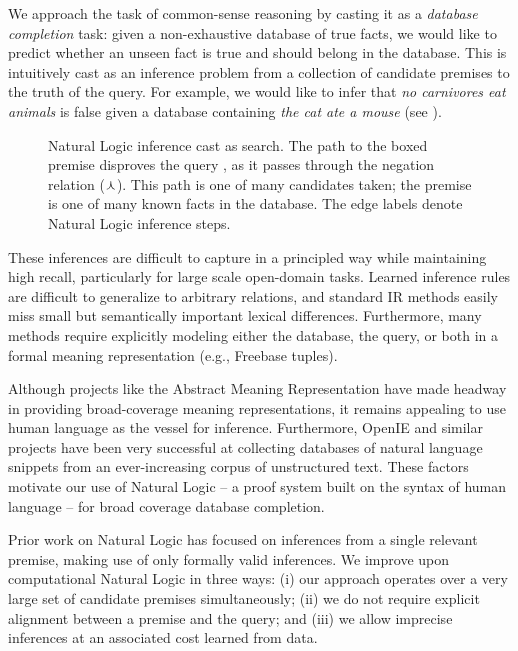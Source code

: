 We approach the task of common-sense reasoning by casting it
  as a \textit{database completion} task: given a non-exhaustive
  database of true facts, we would like to predict whether an unseen fact
  is true and should belong in the database.
This is intuitively cast as an inference problem from 
  a collection of candidate premises to the truth of the query.
For example, we would like to infer 
  that \textit{no carnivores eat animals}
  is false given a database containing \textit{the cat ate a mouse}
  (see ).

\begin{figure}[th]
\begin{center}
  \teaserSearch
\end{center}
{
  Natural Logic inference cast as search. The path to
    the boxed premise  disproves the
    query , as it passes through
    the negation relation ($\curlywedge$).
  This path is one of many candidates taken; the premise
    is one of many known facts in the database.
  The edge labels denote Natural Logic inference steps.
  \label{fig:teaser}
}
\end{figure}

These inferences are difficult to capture in a principled way
  while maintaining high recall, particularly for 
  large scale open-domain tasks.
Learned inference rules are difficult to generalize to arbitrary
  relations, and standard IR methods easily miss small but
  semantically important lexical differences.
Furthermore, many methods require explicitly modeling either the
  database, the query, or both in a formal meaning representation
  (e.g., Freebase tuples).

Although projects like the Abstract Meaning Representation
  \cite{key:2013banarescu-amr} have made headway in providing
  broad-coverage meaning representations, it remains 
  appealing to use human language as the vessel for
  inference.
Furthermore, OpenIE and similar projects have been very successful at
  collecting databases of natural language snippets
  from an ever-increasing corpus of unstructured text.
These factors motivate our use of Natural Logic -- a proof system built
  on the syntax of human language -- for
  broad coverage database completion.

Prior work on Natural Logic has focused on inferences from a single
  relevant premise, making use of only
  formally valid inferences.
We improve upon computational Natural Logic in three ways:
  (i) our approach operates over a very large set of
    candidate premises simultaneously;
  (ii) we do not require explicit alignment between a premise 
    and the query;
  and (iii) we allow imprecise inferences at an
    associated cost learned from data.

